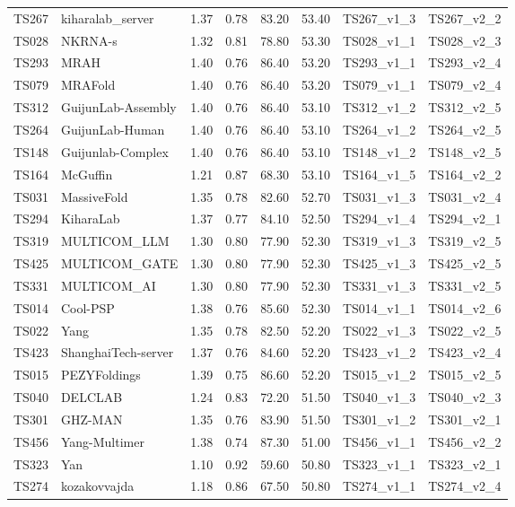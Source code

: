 \begin{longtable}{llllllll}
TS267 & kiharalab\_server & 1.37 & 0.78 & 83.20 & 53.40 & TS267\_v1\_3 & TS267\_v2\_2 \\ 
TS028 & NKRNA-s & 1.32 & 0.81 & 78.80 & 53.30 & TS028\_v1\_1 & TS028\_v2\_3 \\ 
TS293 & MRAH & 1.40 & 0.76 & 86.40 & 53.20 & TS293\_v1\_1 & TS293\_v2\_4 \\ 
TS079 & MRAFold & 1.40 & 0.76 & 86.40 & 53.20 & TS079\_v1\_1 & TS079\_v2\_4 \\ 
TS312 & GuijunLab-Assembly & 1.40 & 0.76 & 86.40 & 53.10 & TS312\_v1\_2 & TS312\_v2\_5 \\ 
TS264 & GuijunLab-Human & 1.40 & 0.76 & 86.40 & 53.10 & TS264\_v1\_2 & TS264\_v2\_5 \\ 
TS148 & Guijunlab-Complex & 1.40 & 0.76 & 86.40 & 53.10 & TS148\_v1\_2 & TS148\_v2\_5 \\ 
TS164 & McGuffin & 1.21 & 0.87 & 68.30 & 53.10 & TS164\_v1\_5 & TS164\_v2\_2 \\ 
TS031 & MassiveFold & 1.35 & 0.78 & 82.60 & 52.70 & TS031\_v1\_3 & TS031\_v2\_4 \\ 
TS294 & KiharaLab & 1.37 & 0.77 & 84.10 & 52.50 & TS294\_v1\_4 & TS294\_v2\_1 \\ 
TS319 & MULTICOM\_LLM & 1.30 & 0.80 & 77.90 & 52.30 & TS319\_v1\_3 & TS319\_v2\_5 \\ 
TS425 & MULTICOM\_GATE & 1.30 & 0.80 & 77.90 & 52.30 & TS425\_v1\_3 & TS425\_v2\_5 \\ 
TS331 & MULTICOM\_AI & 1.30 & 0.80 & 77.90 & 52.30 & TS331\_v1\_3 & TS331\_v2\_5 \\ 
TS014 & Cool-PSP & 1.38 & 0.76 & 85.60 & 52.30 & TS014\_v1\_1 & TS014\_v2\_6 \\ 
TS022 & Yang & 1.35 & 0.78 & 82.50 & 52.20 & TS022\_v1\_3 & TS022\_v2\_5 \\ 
TS423 & ShanghaiTech-server & 1.37 & 0.76 & 84.60 & 52.20 & TS423\_v1\_2 & TS423\_v2\_4 \\ 
TS015 & PEZYFoldings & 1.39 & 0.75 & 86.60 & 52.20 & TS015\_v1\_2 & TS015\_v2\_5 \\ 
TS040 & DELCLAB & 1.24 & 0.83 & 72.20 & 51.50 & TS040\_v1\_3 & TS040\_v2\_3 \\ 
TS301 & GHZ-MAN & 1.35 & 0.76 & 83.90 & 51.50 & TS301\_v1\_2 & TS301\_v2\_1 \\ 
TS456 & Yang-Multimer & 1.38 & 0.74 & 87.30 & 51.00 & TS456\_v1\_1 & TS456\_v2\_2 \\ 
TS323 & Yan & 1.10 & 0.92 & 59.60 & 50.80 & TS323\_v1\_1 & TS323\_v2\_1 \\ 
TS274 & kozakovvajda & 1.18 & 0.86 & 67.50 & 50.80 & TS274\_v1\_1 & TS274\_v2\_4 \\ 

\end{longtable}
